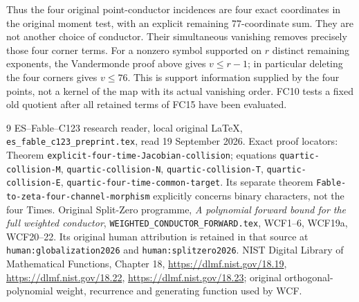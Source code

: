 \documentclass[11pt]{article}
\begin{document}
Thus the four original point-conductor incidences are four exact
coordinates in the original moment test, with an explicit remaining
77-coordinate sum. They are not another choice of conductor. Their
simultaneous vanishing removes precisely those four corner terms.
For a nonzero symbol supported on $r$ distinct remaining exponents,
the Vandermonde proof above gives $v\le r-1$; in particular deleting
the four corners gives $v\le76$. This is support information supplied
by the four points, not a kernel of the map with its actual vanishing
order. FC10 tests a fixed old quotient after all retained terms of
FC15 have been evaluated.

\begin{thebibliography}{9}
 ES--Fable--C123 research reader, local original \LaTeX,
\texttt{es\_fable\_c123\_preprint.tex}, read 19 September 2026.
Exact proof locators: Theorem
\texttt{explicit-four-time-Jacobian-collision}; equations
\texttt{quartic-collision-M}, \texttt{quartic-collision-N},
\texttt{quartic-collision-T}, \texttt{quartic-collision-E},
\texttt{quartic-four-time-common-target}.
Its separate theorem \texttt{Fable-to-zeta-four-channel-morphism}
explicitly concerns binary characters, not the four Times.
 Original Split-Zero programme, \emph{A polynomial forward
bound for the full weighted conductor},
\texttt{WEIGHTED\_CONDUCTOR\_FORWARD.tex}, WCF1--6, WCF19a, WCF20--22.
Its original human attribution is retained in that source at
\texttt{human:globalization2026} and \texttt{human:splitzero2026}.
 NIST Digital Library of Mathematical Functions,
Chapter 18, \url{https://dlmf.nist.gov/18.19},
\url{https://dlmf.nist.gov/18.22},
\url{https://dlmf.nist.gov/18.23}; original orthogonal-polynomial
weight, recurrence and generating function used by WCF.
\end{thebibliography}
\end{document}
